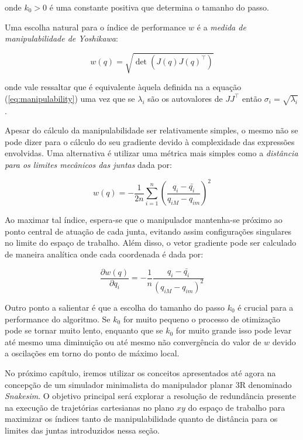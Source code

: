 onde \(k_0 > 0\) é uma constante positiva que determina o tamanho do passo.

Uma escolha natural para o índice de performance \(w\) é a \emph{medida de
    manipulabilidade de Yoshikawa}:

\begin{equation}
    w(q) = \sqrt{\det(J(q){J(q)}^\top)}
\end{equation}

onde vale ressaltar que é equivalente àquela definida na a equação
(\ref{eq:manipulability}) uma vez que se \(\lambda_i\) são os autovalores de
\(J J^\top\) então \(\sigma_i = \sqrt{\lambda_i}\).

Apesar do cálculo da manipulabilidade ser relativamente simples, o mesmo não se
pode dizer para o cálculo do seu gradiente devido à complexidade das expressões
envolvidas. Uma alternativa é utilizar uma métrica mais simples como a
\emph{distância para os limites mecânicos das juntas} dada por:

\begin{equation}
    w(q) = -\frac{1}{2n} \sum_{i=1}^{n}{{\left(\frac{q_i - \bar{q_i}}{q_{iM} - q_{im}}\right)}^2}
\end{equation}

Ao maximar tal índice, espera-se que o manipulador mantenha-se próximo ao ponto
central de atuação de cada junta, evitando assim configurações singulares no
limite do espaço de trabalho. Além disso, o vetor gradiente pode ser calculado
de maneira analítica onde cada coordenada é dada por:

\begin{equation}
    \frac{\partial w(q)}{\partial q_i} = -\frac{1}{n} \frac{q_i - \bar{q_i}}{{(q_{iM} - q_{im})}^2}
\end{equation}

Outro ponto a salientar é que a escolha do tamanho do passo \(k_0\) é crucial
para a performance do algoritmo. Se \(k_0\) for muito pequeno o processo de
otimização pode se tornar muito lento, enquanto que se \(k_0\) for muito grande
isso pode levar até mesmo uma diminuição ou até mesmo não convergência do valor
de \(w\) devido a oscilações em torno do ponto de máximo local.

No próximo capítulo, iremos utilizar os conceitos apresentados até agora na
concepção de um simulador minimalista do manipulador planar 3R denominado
\emph{Snakesim}. O objetivo principal será explorar a resolução de redundância
presente na execução de trajetórias cartesianas no plano \(xy\) do espaço de
trabalho para maximizar os índices tanto de manipulabilidade quanto de distância
para os limites das juntas introduzidos nessa seção.
